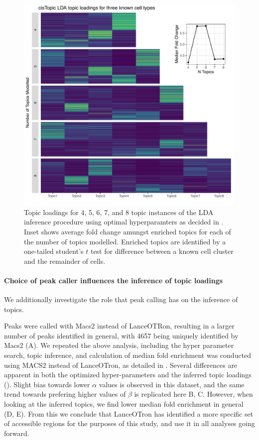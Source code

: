 \begin{figure}
  \centering
  \includegraphics[width=\textwidth]{plot/ch4/sc_topics.pdf}
  \caption{Topic loadings for 4, 5, 6, 7, and 8 topic instances of the LDA inference procedure using optimal hyperparamters as decided in . Inset shows average fold change amungst enriched topics for each of the number of topics modelled. Enriched topics are identified by a one-tailed student's $t$ test for difference between a known cell cluster and the remainder of cells.} 
  \label{fig:sc_topics}
\end{figure}

\paragraph{Choice of peak caller influences the inference of topic loadings}

We additionally investigate the role that peak calling has on the inference of topics. 

Peaks were called with Macs2 instead of LanceOTRon, resulting in a larger number of peaks identified in general, with 4657 being uniquely identified by Macs2 (A). We repeated the above analysis, including the hyper parameter search, topic inference, and calculation of median fold enrichment was conducted using MACS2 instead of LanceOTron, as detailed in . Several differences are apparent in both the optimized hyper-parameters and the inferred topic loadings (). Slight bias towards lower $\alpha$ values is observed in this dataset, and the same trend towards prefering higher values of $\beta$ is replicated here B, C. However, when looking at the inferred topics, we find lower median fold enrichment in general (D, E). From this we conclude that LanceOTron has identified a more specific set of accessible regions for the purposes of this study, and use it in all analyses going forward. 

